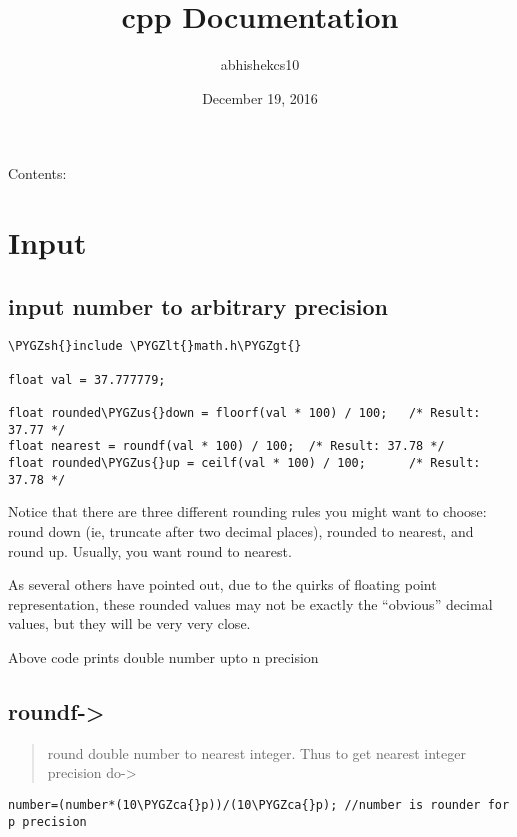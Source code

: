 \documentclass[letterpaper,10pt,english]{sphinxmanual}
\title{cpp Documentation}
\date{December 19, 2016}
\author{abhishekcs10}
\def\PYGZus{\char`\_}
\def\PYGZca{\char`\^}
\def\PYGZlt{\char`\<}
\def\PYGZgt{\char`\>}
\def\PYGZsh{\char`\#}
\begin{document}
\maketitle
\tableofcontents
{}\label{index::doc}


Contents:


\chapter{Input}
\label{input:welcome-c}\label{input::doc}\label{input:input}

\section{input number to arbitrary precision}
\label{input:input-number-to-arbitrary-precision}
\begin{Verbatim}[commandchars=\\\{\}]
\PYGZsh{}include \PYGZlt{}math.h\PYGZgt{}

float val = 37.777779;

float rounded\PYGZus{}down = floorf(val * 100) / 100;   /* Result: 37.77 */
float nearest = roundf(val * 100) / 100;  /* Result: 37.78 */
float rounded\PYGZus{}up = ceilf(val * 100) / 100;      /* Result: 37.78 */
\end{Verbatim}

Notice that there are three different rounding rules you might want to choose: round down (ie, truncate after two decimal places), rounded to nearest, and round up. Usually, you want round to nearest.

As several others have pointed out, due to the quirks of floating point representation, these rounded values may not be exactly the ``obvious'' decimal values, but they will be very very close.

Above code prints double number upto n precision


\section{roundf-\textgreater{}}
\label{input:roundf}\begin{quote}

round double number to nearest integer. Thus to get nearest integer precision do-\textgreater{}
\end{quote}

\begin{Verbatim}[commandchars=\\\{\}]
number=(number*(10\PYGZca{}p))/(10\PYGZca{}p); //number is rounder for p precision
\end{Verbatim}
\end{document}
